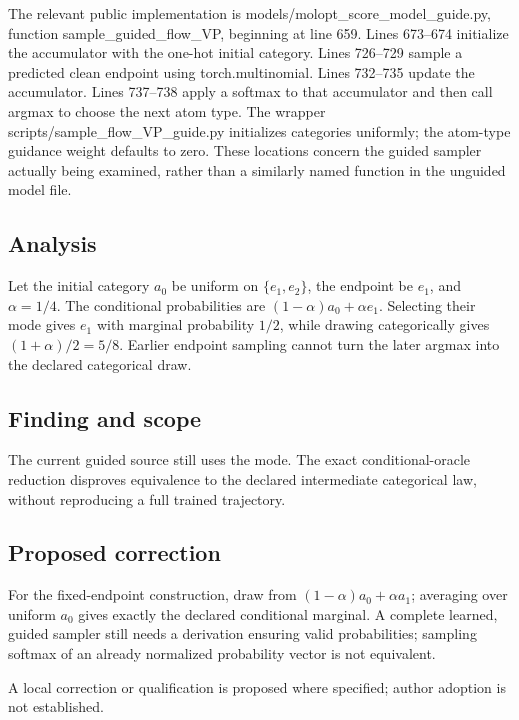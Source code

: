 \documentclass[11pt]{article}
\begin{document}
The relevant public implementation is models/molopt\_score\_model\_guide.py, function sample\_guided\_flow\_VP, beginning at line 659. Lines 673–674 initialize the accumulator with the one-hot initial category. Lines 726–729 sample a predicted clean endpoint using torch.multinomial. Lines 732–735 update the accumulator. Lines 737–738 apply a softmax to that accumulator and then call argmax to choose the next atom type. The wrapper scripts/sample\_flow\_VP\_guide.py initializes categories uniformly; the atom-type guidance weight defaults to zero. These locations concern the guided sampler actually being examined, rather than a similarly named function in the unguided model file.

\subsection*{Analysis}

Let the initial category \(a_0\) be uniform on \(\{e_1,e_2\}\), the endpoint be \(e_1\), and \(\alpha=1/4\). The conditional probabilities are \((1-\alpha)a_0+\alpha e_1\). Selecting their mode gives \(e_1\) with marginal probability \(1/2\), while drawing categorically gives \((1+\alpha)/2=5/8\). Earlier endpoint sampling cannot turn the later argmax into the declared categorical draw.

\subsection*{Finding and scope}

The current guided source still uses the mode. The exact conditional-oracle reduction disproves equivalence to the declared intermediate categorical law, without reproducing a full trained trajectory.

\subsection*{Proposed correction}

For the fixed-endpoint construction, draw from \((1-\alpha)a_0+\alpha a_1\); averaging over uniform \(a_0\) gives exactly the declared conditional marginal. A complete learned, guided sampler still needs a derivation ensuring valid probabilities; sampling softmax of an already normalized probability vector is not equivalent.

A local correction or qualification is proposed where specified; author adoption is not established.
\end{document}
